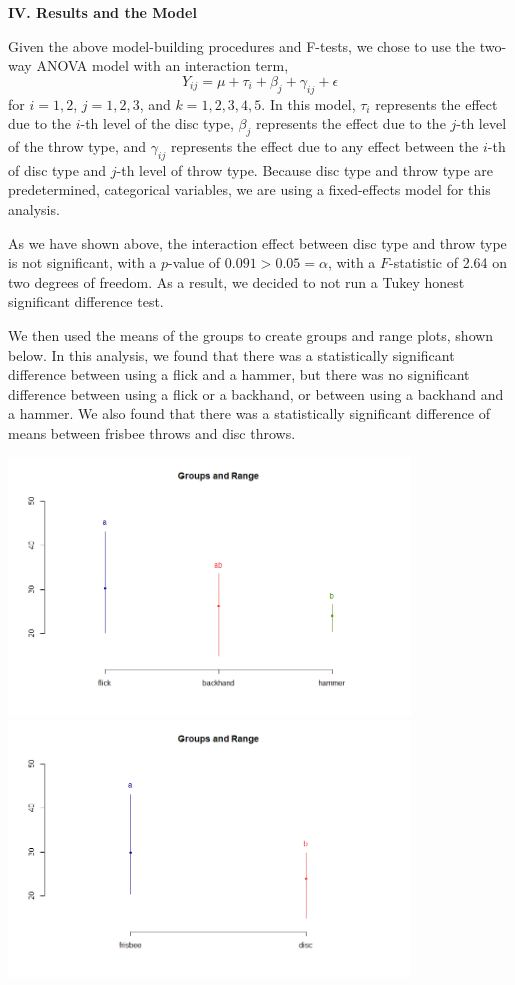 \documentclass[letter,12pt]{article}
\begin{document}
	\begin{center}
		\textbf{IV. Results and the Model}\par
	\end{center}
	\justify
	Given the above model-building procedures and F-tests, we chose to use the two-way ANOVA model with an interaction term,
	$$Y_{ij} = \mu + \tau_{i} + \beta_{j} + \gamma_{ij} + \epsilon$$
	for $i = 1, 2$, $j = 1, 2, 3$, and $k=1, 2, 3, 4, 5$. In this model, $\tau_{i}$ represents the effect due to the $i$-th level of the disc type, $\beta_{j}$ represents the effect due to the $j$-th level of the throw type, and $\gamma_{ij}$ represents the effect due to any effect between the $i$-th of disc type and $j$-th level of throw type. Because disc type and throw type are predetermined, categorical variables, we are using a fixed-effects model for this analysis.\par
	As we have shown above, the interaction effect between disc type and throw type is not significant, with a $p$-value of $0.091 > 0.05 = \alpha$, with a $F$-statistic of 2.64 on two degrees of freedom. As a result, we decided to not run a Tukey honest significant difference test. \par
	We then used the means of the groups to create groups and range plots, shown below. In this analysis, we found that there was a statistically significant difference between using a flick and a hammer, but there was no significant difference between using a flick or a backhand, or between using a backhand and a hammer. We also found that there was a statistically significant difference of means between frisbee throws and disc throws.\par
	\begin{center}
    \includegraphics[width=0.8\textwidth]{grouprangethrow.png}
    \includegraphics[width=0.8\textwidth]{grouprangedisc.png}
  \end{center}
\end{document}
